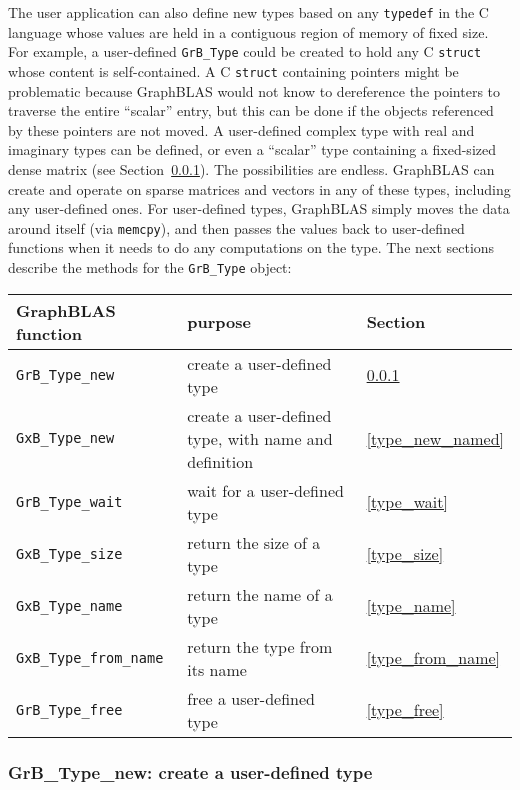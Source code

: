 \documentclass[12pt]{article}
\begin{document}
{The user application can also define new types based on any \verb'typedef' in
the C language whose values are held in a contiguous region of memory of fixed
size.  For example, a user-defined \verb'GrB_Type' could be created to hold any
C \verb'struct' whose content is self-contained.  A C \verb'struct' containing
pointers might be problematic because GraphBLAS would not know to dereference
the pointers to traverse the entire ``scalar'' entry, but this can be done if
the objects referenced by these pointers are not moved.  A user-defined complex
type with real and imaginary types can be defined, or even a ``scalar'' type
containing a fixed-sized dense matrix (see Section~\ref{type_new}).  The
possibilities are endless.  GraphBLAS can create and operate on sparse matrices
and vectors in any of these types, including any user-defined ones.  For
user-defined types, GraphBLAS simply moves the data around itself (via
\verb'memcpy'), and then passes the values back to user-defined functions when
it needs to do any computations on the type.  The next sections describe the
methods for the \verb'GrB_Type' object:

\vspace{0.2in}
{\footnotesize
\begin{tabular}{lll}
\hline
GraphBLAS function       & purpose                          & Section \\
\hline
\verb'GrB_Type_new'      & create a user-defined type       & \ref{type_new} \\
\verb'GxB_Type_new'      & create a user-defined type,
                            with name and definition        & \ref{type_new_named} \\
\verb'GrB_Type_wait'     & wait for a user-defined type     & \ref{type_wait} \\
\verb'GxB_Type_size'     & return the size of a type        & \ref{type_size} \\
\verb'GxB_Type_name'     & return the name of a type        & \ref{type_name} \\
\verb'GxB_Type_from_name'& return the type from its name    & \ref{type_from_name} \\
\verb'GrB_Type_free'     & free a user-defined type         & \ref{type_free} \\
\hline
\end{tabular}
}

\subsubsection{{\sf GrB\_Type\_new:} create a user-defined type}
\label{type_new}

}
\end{document}
